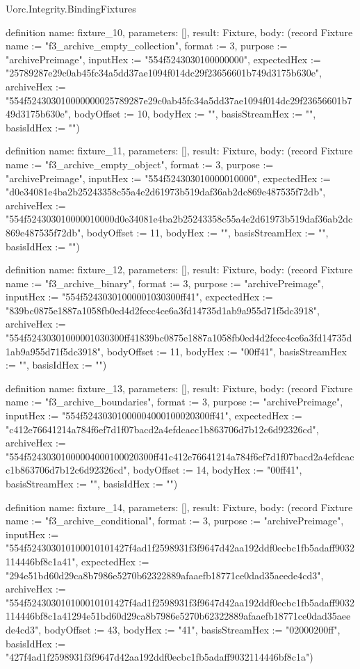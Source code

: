 \begin{lexlean}{Uorc.Integrity.BindingFixtures}
\begin{semanticmodule}
definition{
  name: fixture_10,
  parameters: [],
  result: Fixture,
  body: (record Fixture {name := "f3_archive_empty_collection", format := 3, purpose := "archivePreimage", inputHex := "554f5243030100000000", expectedHex := "25789287e29c0ab45fc34a5dd37ae1094f014dc29f23656601b749d3175b630e", archiveHex := "554f524303010000000025789287e29c0ab45fc34a5dd37ae1094f014dc29f23656601b749d3175b630e", bodyOffset := 10, bodyHex := "", basisStreamHex := "", basisIdHex := ""})
}

definition{
  name: fixture_11,
  parameters: [],
  result: Fixture,
  body: (record Fixture {name := "f3_archive_empty_object", format := 3, purpose := "archivePreimage", inputHex := "554f524303010000010000", expectedHex := "d0e34081e4ba2b25243358c55a4e2d61973b519daf36ab2dc869e487535f72db", archiveHex := "554f524303010000010000d0e34081e4ba2b25243358c55a4e2d61973b519daf36ab2dc869e487535f72db", bodyOffset := 11, bodyHex := "", basisStreamHex := "", basisIdHex := ""})
}

definition{
  name: fixture_12,
  parameters: [],
  result: Fixture,
  body: (record Fixture {name := "f3_archive_binary", format := 3, purpose := "archivePreimage", inputHex := "554f52430301000001030300ff41", expectedHex := "839bc0875e1887a1058fb0ed4d2fecc4ce6a3fd14735d1ab9a955d71f5dc3918", archiveHex := "554f52430301000001030300ff41839bc0875e1887a1058fb0ed4d2fecc4ce6a3fd14735d1ab9a955d71f5dc3918", bodyOffset := 11, bodyHex := "00ff41", basisStreamHex := "", basisIdHex := ""})
}

definition{
  name: fixture_13,
  parameters: [],
  result: Fixture,
  body: (record Fixture {name := "f3_archive_boundaries", format := 3, purpose := "archivePreimage", inputHex := "554f52430301000004000100020300ff41", expectedHex := "c412e76641214a784f6ef7d1f07bacd2a4efdcacc1b863706d7b12c6d92326cd", archiveHex := "554f52430301000004000100020300ff41c412e76641214a784f6ef7d1f07bacd2a4efdcacc1b863706d7b12c6d92326cd", bodyOffset := 14, bodyHex := "00ff41", basisStreamHex := "", basisIdHex := ""})
}

definition{
  name: fixture_14,
  parameters: [],
  result: Fixture,
  body: (record Fixture {name := "f3_archive_conditional", format := 3, purpose := "archivePreimage", inputHex := "554f524303010100010101427f4ad1f2598931f3f9647d42aa192ddf0ecbc1fb5adaff9032114446bf8c1a41", expectedHex := "294e51bd60d29ca8b7986e5270b62322889afaaefb18771ce0dad35aeede4cd3", archiveHex := "554f524303010100010101427f4ad1f2598931f3f9647d42aa192ddf0ecbc1fb5adaff9032114446bf8c1a41294e51bd60d29ca8b7986e5270b62322889afaaefb18771ce0dad35aeede4cd3", bodyOffset := 43, bodyHex := "41", basisStreamHex := "02000200ff", basisIdHex := "427f4ad1f2598931f3f9647d42aa192ddf0ecbc1fb5adaff9032114446bf8c1a"})
}


\end{semanticmodule}
\end{lexlean}

